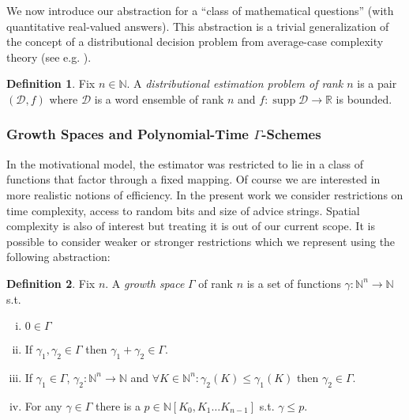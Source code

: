 \documentclass{article}
\numberwithin{equation}{section}
\theoremstyle{definition}
\newtheorem{definition}{Definition}[section]
\theoremstyle{plain}
\DeclareMathOperator{\Supp}{supp}
\newcommand{\Nats}{\mathbb{N}}
\newcommand{\Reals}{\mathbb{R}}
\newcommand{\NatPoly}{\Nats[K_0, K_1 \ldots K_{n-1}]}
\newcommand{\NatFun}{\Nats^n \rightarrow}
\newcommand{\Dist}{\mathcal{D}}
\begin{document}
We now introduce our abstraction for a \enquote{class of mathematical questions} (with quantitative real-valued answers). This abstraction is a trivial generalization of the concept of a distributional decision problem from average-case complexity theory (see e.g. \cite{Bogdanov_2006}).

\begin{definition}

Fix ${n \in \Nats}$. A \emph{distributional estimation problem of rank ${n}$} is a pair $(\Dist,f)$ where $\Dist$ is a word ensemble of rank ${n}$ and $f: \Supp \Dist \rightarrow \Reals$ is bounded.

\end{definition}

\subsubsection{Growth Spaces and Polynomial-Time \texorpdfstring{$\Gamma$}{Γ}-Schemes}

In the motivational model, the estimator was restricted to lie in a class of functions that factor through a fixed mapping. Of course we are interested in more realistic notions of efficiency. In the present work we consider restrictions on time complexity, access to random bits and size of advice strings. Spatial complexity is also of interest but treating it is out of our current scope. It is possible to consider weaker or stronger restrictions which we represent using the following abstraction:

\begin{samepage}
\begin{definition}
\label{def:grow}
Fix $n$. A \emph{growth space} $\Gamma$ of rank $n$ is a set of functions ${\gamma: \NatFun \Nats}$ s.t.

\begin{enumerate}[(i)]

\item\label{con:def__grow__zero} $0 \in \Gamma$

\item\label{con:def__grow__add} If $\gamma_1, \gamma_2 \in \Gamma$ then $\gamma_1 + \gamma_2 \in \Gamma$.

\item\label{con:def__grow__ineq} If $\gamma_1 \in \Gamma$, $\gamma_2: \NatFun \Nats$ and $\forall K \in \Nats^n: \gamma_2(K) \leq \gamma_1(K)$ then $\gamma_2 \in \Gamma$.

\item\label{con:def__grow__poly} For any $\gamma \in \Gamma$ there is a $p \in \NatPoly$ s.t. $\gamma \leq p$.

\end{enumerate}

\end{definition}
\end{samepage}
\end{document}
